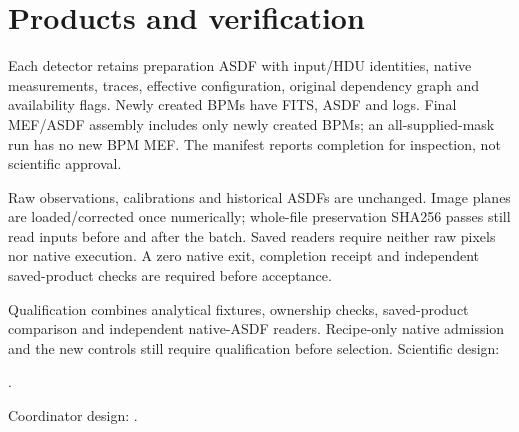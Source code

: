 \documentclass[10pt,a4paper]{article}
\begin{document}
\section*{Products and verification}
Each detector retains preparation ASDF with input/HDU identities, native
measurements, traces, effective configuration, original dependency graph and
availability flags. Newly created BPMs have FITS, ASDF and logs. Final MEF/ASDF
assembly includes only newly created BPMs; an all-supplied-mask run has no new
BPM MEF. The manifest reports completion for inspection, not scientific approval.

Raw observations, calibrations and historical ASDFs are unchanged. Image planes
are loaded/corrected once numerically; whole-file preservation SHA256 passes
still read inputs before and after the batch. Saved readers require neither
raw pixels nor native execution. A zero native exit, completion receipt and
independent saved-product checks are required before acceptance.

Qualification combines analytical fixtures, ownership checks, saved-product
comparison and independent native-ASDF readers. Recipe-only native admission
and the new controls still require qualification before selection.
Scientific design:\par
{}.\par
Coordinator design: .
\end{document}
